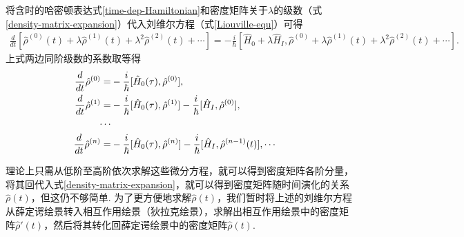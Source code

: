 \documentclass{assignment}
\begin{document}
将含时的哈密顿表达式\eqref{time-dep-Hamiltonian}和密度矩阵关于$\lambda$的级数（式\eqref{density-matrix-expansion}）代入刘维尔方程（式\eqref{Liouville-equ}）可得
\begin{align}
    \frac{d}{dt}\left[\hat{\rho}^{(0)}(t)+\lambda\hat{\rho}^{(1)}(t)+\lambda^2\hat{\rho}^{(2)}(t)+\cdots\right]=-\frac{i}{\hbar}\left[\hat{H}_0+\lambda\hat{H}_I,\hat{\rho}^{(0)}+\lambda\hat{\rho}^{(1)}(t)+\lambda^2\hat{\rho}^{(2)}(t)+\cdots\right].
\end{align}
上式两边同阶级数的系数取等得
\begin{align}
    \frac{d}{dt}\hat{\rho}^{(0)}=&-\frac{i}{\hbar}[\hat{H}_0(\tau),\hat{\rho}^{(0)}],\\
    \frac{d}{dt}\hat{\rho}^{(1)}=&-\frac{i}{\hbar}[\hat{H}_0(\tau),\hat{\rho}^{(1)}]-\frac{i}{\hbar}[\hat{H}_I,\hat{\rho}^{(0)}],\\
    \notag\cdots&\\
    \frac{d}{dt}\hat{\rho}^{(n)}=&-\frac{i}{\hbar}[\hat{H}_0(\tau),\hat{\rho}^{(n)}]-\frac{i}{\hbar}[\hat{H}_I,\hat{\rho}^{(n-1)}(t)],
    \notag\cdots&
\end{align}

理论上只需从低阶至高阶依次求解这些微分方程，就可以得到密度矩阵各阶分量，将其回代入式\eqref{density-matrix-expansion}，就可以得到密度矩阵随时间演化的关系$\hat{\rho}(t)$，但这仍不够简单. 为了更方便地求解$\hat{\rho}(t)$，我们暂时将上述的刘维尔方程从薛定谔绘景转入相互作用绘景（狄拉克绘景），求解出相互作用绘景中的密度矩阵$\hat{\rho}'(t)$，然后将其转化回薛定谔绘景中的密度矩阵$\hat{\rho}(t)$.
\end{document}
